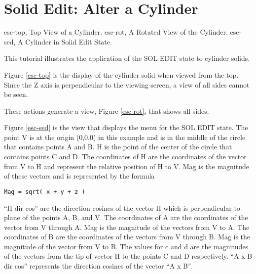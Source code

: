\section{Solid Edit: Alter a Cylinder}
\mfig esc-top, Top View of a Cylinder.
\mfig esc-rot, A Rotated View of the Cylinder.
\mfig esc-sed, A Cylinder in Solid Edit State.

This tutorial illustrates the application of the SOL EDIT state to
cylinder solids.


Figure \ref{esc-top} is the display of the cylinder solid
when viewed from the top.
Since the
Z axis is perpendicular to the viewing screen, a view of all sides cannot be
seen.


These actions generate a view, Figure \ref{esc-rot}, that shows all sides.


Figure \ref{esc-sed} is the view that displays the menu
for the SOL EDIT state.
The
point V is at the origin (0,0,0) in this example and is in the middle of the
circle that contains points A and B.  H is the point of the center of the
circle that contains points C and D.  The coordinates of H are the coordinates
of the vector from V to H and represent the relative position of H to V.  Mag
is the magnitude of these vectors and is represented by the formula
\begin{center}
\begin{verbatim}
Mag = sqrt( x + y + z )
\end{verbatim}
\end{center}

``H dir cos'' are the direction cosines of the vector H which
is perpendicular to plane of the points A, B, and V.  The coordinates of A
are the coordinates of the vector from V through A.  Mag is the magnitude of
the vectors from V to A.  The coordinates of B are the coordinates of the
vectors from V through B.  Mag is the magnitude of the vector from V to B.
The values for c and d are the magnitudes of the vectors from the tip of
vector H to the points C
and D respectively.
``A x B dir cos'' represents the direction cosines of the
vector ``A x B''.

